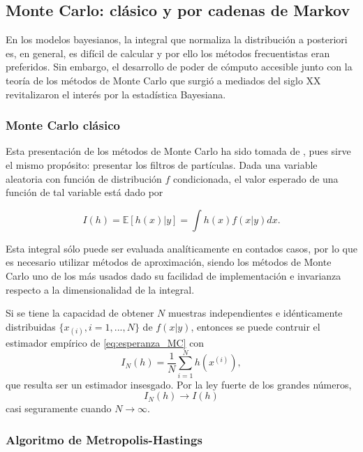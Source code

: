 \subsection{Monte Carlo: clásico y por cadenas de Markov}

En los modelos bayesianos, la integral que normaliza la distribución a posteriori 
es, en general, es difícil de calcular y por ello los métodos frecuentistas eran preferidos. 
Sin embargo, el desarrollo de poder de cómputo accesible junto con la teoría de los métodos de Monte Carlo 
que surgió a mediados del siglo XX revitalizaron el interés por la estadística Bayesiana. 

\subsubsection{Monte Carlo clásico}

Esta presentación de los métodos de Monte Carlo ha sido tomada de \cite{doucetSequentialMonteCarlo2001}, pues 
sirve el mismo propósito: presentar los filtros de partículas. Dada una variable aleatoria con función de 
distribución $f$ condicionada, el valor 
esperado de una función de tal variable está dado por

\begin{equation}\label{eq:esperanza_MC}
    I(h) = \mathbb E\left[h(x)|y\right]=\int h(x)f(x|y)dx.
\end{equation} 

Esta integral sólo puede ser evaluada analíticamente en contados casos, por lo que es 
necesario utilizar métodos de aproximación, siendo los métodos de Monte Carlo uno de 
los más usados dado su facilidad de implementación e invarianza respecto a la 
dimensionalidad de la integral.

Si se tiene la capacidad de obtener $N$ muestras independientes e idénticamente distribuidas $\{x_{(i)},i=1,...,N\}$
de $f(x|y)$, entonces se puede contruir el estimador empírico de \ref{eq:esperanza_MC} con
\begin{equation}
    I_N(h) = \frac{1}{N}\sum_{i=1}^{N}h(x^{(i)}),
\end{equation}
que resulta ser un estimador insesgado. Por la ley fuerte de los grandes números, 
\begin{equation}
    I_N(h) \to I(h)
\end{equation}
casi seguramente cuando $N\to \infty$. 

\subsubsection{Algoritmo de Metropolis-Hastings}

